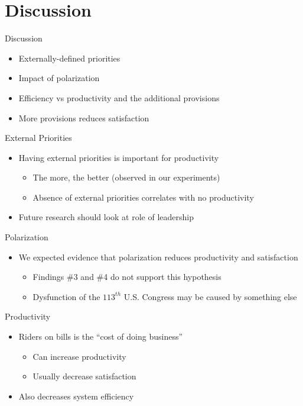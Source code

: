 \documentclass[14pt]{beamer}
\begin{document}
\section*{Discussion} %

\begin{frame}{Discussion}
\begin{itemize}
\item Externally-defined priorities 
\item Impact of polarization
\item Efficiency vs productivity and the additional provisions
\item More provisions reduces satisfaction 
\end{itemize}
\end{frame}


\begin{frame}{External Priorities}
\begin{itemize}
\item Having external priorities is important for productivity
 \begin{itemize}
 \item The more, the better (observed in our experiments)
 \item Absence of external priorities correlates with no productivity
 \end{itemize}
\item  Future research should look at role of leadership 
\end{itemize}
\end{frame}

\begin{frame}{Polarization}
\begin{itemize}
\item We expected evidence that polarization reduces productivity and satisfaction
 \begin{itemize}
 \item Findings \#3 and \#4 do not support this hypothesis
 \item Dysfunction of the $113^{th}$ U.S. Congress may be caused by something else
 \end{itemize}
\end{itemize}
\end{frame}

\begin{frame}{Productivity}
\begin{itemize}
\item Riders on bills is the ``cost of doing business''
 \begin{itemize}
 \item Can increase productivity
 \item Usually decrease satisfaction
 \end{itemize}
\item Also decreases system efficiency 
\end{itemize}
\end{frame}
\end{document}
